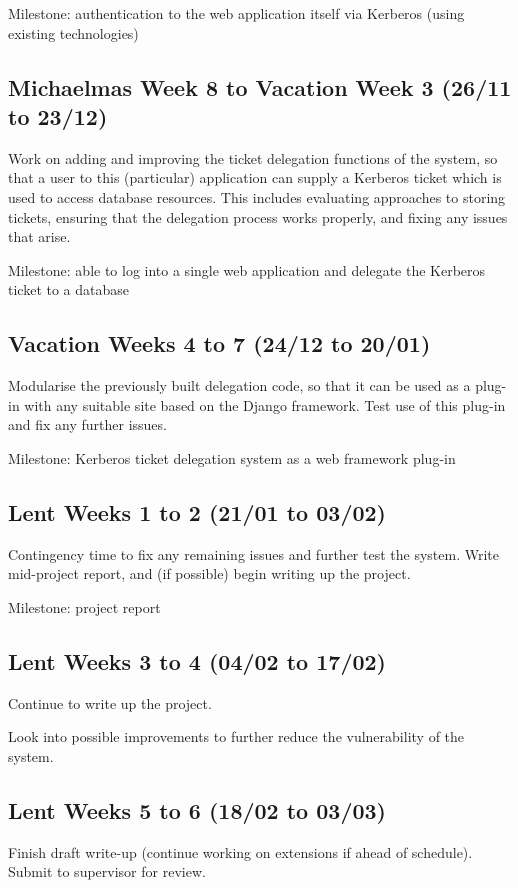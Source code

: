 \documentclass{article}
\begin{document}
Milestone: authentication to the web application itself via Kerberos (using existing technologies)

\subsection*{Michaelmas Week 8 to Vacation Week 3 (26/11 to 23/12)}
Work on adding and improving the ticket delegation functions of the system, so that a user to this (particular) application can supply a Kerberos ticket which is used to access database resources. This includes evaluating approaches to storing tickets, ensuring that the delegation process works properly, and fixing any issues that arise.

Milestone: able to log into a single web application and delegate the Kerberos ticket to a database

\subsection*{Vacation Weeks 4 to 7 (24/12 to 20/01)}
Modularise the previously built delegation code, so that it can be used as a plug-in with any suitable site based on the Django framework. Test use of this plug-in and fix any further issues.

Milestone: Kerberos ticket delegation system as a web framework plug-in

\subsection*{Lent Weeks 1 to 2 (21/01 to 03/02)}
Contingency time to fix any remaining issues and further test the system.
Write mid-project report, and (if possible) begin writing up the project.

Milestone: project report

\subsection*{Lent Weeks 3 to 4 (04/02 to 17/02)}
Continue to write up the project.

Look into possible improvements to further reduce the vulnerability of the system.

\subsection*{Lent Weeks 5 to 6 (18/02 to 03/03)}
Finish draft write-up (continue working on extensions if ahead of schedule). Submit to supervisor for review.
\end{document}
